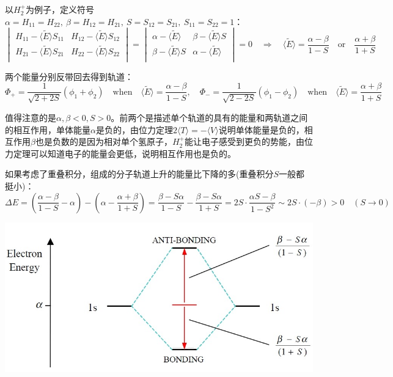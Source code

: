 以$H_2^+$为例子，定义符号$\alpha=H_{11}=H_{22}, \ \beta=H_{12}=H_{21}, \ S=S_{12}=S_{21}, \ S_{11}=S_{22}=1$：
\[\begin{vmatrix}
H_{11}-\langle\tilde{E}\rangle S_{11} & H_{12}-\langle\tilde{E}\rangle S_{12} \\
H_{21}-\langle\tilde{E}\rangle S_{21} & H_{22}-\langle\tilde{E}\rangle S_{22} \\
\end{vmatrix}=
\begin{vmatrix}
\alpha-\langle\tilde{E}\rangle & \beta-\langle\tilde{E}\rangle S \\
\beta-\langle\tilde{E}\rangle S & \alpha-\langle\tilde{E}\rangle \\
\end{vmatrix}=0 \quad \Rightarrow \quad \langle\tilde{E}\rangle=\frac{\alpha-\beta}{1-S} \quad \text{or} \quad \frac{\alpha+\beta}{1+S}\]

两个能量分别反带回去得到轨道：
\[\Phi_+=\frac{1}{\sqrt{2+2S}}(\phi_1+\phi_2) \quad \text{when} \quad \langle\tilde{E}\rangle=\frac{\alpha-\beta}{1-S}, \quad \Phi_-=\frac{1}{\sqrt{2-2S}}(\phi_1-\phi_2) \quad \text{when} \quad \langle\tilde{E}\rangle=\frac{\alpha+\beta}{1+S}\]

值得注意的是$\alpha,\beta<0,S>0$。前两个是描述单个轨道的具有的能量和两轨道之间的相互作用，单体能量$\alpha$是负的，由位力定理$2\langle T \rangle=-\langle V \rangle$说明单体能量是负的，相互作用$\beta$也是负数的是因为相对单个氢原子，$H_2^+$能让电子感受到更负的势能，由位力定理可以知道电子的能量会更低，说明相互作用也是负的。

如果考虑了重叠积分，组成的分子轨道上升的能量比下降的多(重叠积分$S$一般都挺小)：
\[\Delta E=\left(\frac{\alpha-\beta}{1-S}-\alpha\right)-\left(\alpha-\frac{\alpha+\beta}{1+S}\right)=\frac{\beta-S\alpha}{1-S}-\frac{\beta-S\alpha}{1+S}=2S \cdot \frac{\alpha S-\beta}{1-S^2}\sim 2S \cdot (-\beta)>0 \quad (S \to 0)\]

\begin{center}
    \includegraphics[scale=0.3]{fig/lzhx/Picture1.jpg}
\end{center}

